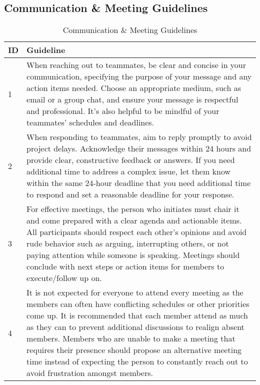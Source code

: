 \documentclass{article}
\begin{document}
\subsection*{Communication \& Meeting Guidelines}
\begin{table}[H]
\caption{Communication \& Meeting Guidelines}
\centering
\begin{tabular}{|l|p{12cm}|}
\hline
\textbf{ID} & \textbf{Guideline} \\ \hline
1 & When reaching out to teammates, be clear and concise in your communication, specifying the purpose of your message and any action items needed. Choose an appropriate medium, such as email or a group chat, and ensure your message is respectful and professional. It's also helpful to be mindful of your teammates' schedules and deadlines. \\ \hline
2 & When responding to teammates, aim to reply promptly to avoid project delays. Acknowledge their messages within 24 hours and provide clear, constructive feedback or answers. If you need additional time to address a complex issue, let them know within the same 24-hour deadline that you need additional time to respond and set a reasonable deadline for your response. \\ \hline
3 & For effective meetings, the person who initiates must chair it and come prepared with a clear agenda and actionable items. All participants should respect each other’s opinions and avoid rude behavior such as arguing, interrupting others, or not paying attention while someone is speaking. Meetings should conclude with next steps or action items for members to execute/follow up on. \\ \hline
4 & It is not expected for everyone to attend every meeting as the members can often have conflicting schedules or other priorities come up. It is recommended that each member attend as much as they can to prevent additional discussions to realign absent members. Members who are unable to make a meeting that requires their presence should propose an alternative meeting time instead of expecting the person to constantly reach out to avoid frustration amongst members. \\ \hline
\end{tabular}
\label{tab:communication-guidelines}
\end{table}
\end{document}
